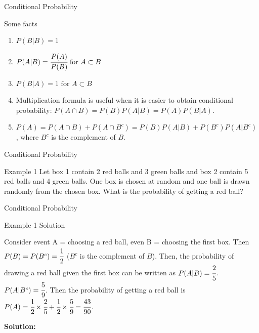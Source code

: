 \documentclass[aspectratio=169,xcolor=dvipsnames,svgnames,x11names,fleqn]{beamer}
\newcommand{\showanswers}{yes}
\begin{document}
    \begin{frame}[containsverbatim]{Conditional Probability}
        \begin{facts}{Some facts}
            \begin{enumerate}
                \item $P(B|B) = 1$
                \item $P(A|B) = \cfrac{P(A)}{P(B)} \text{~for~} A \subset B$
                \item $P (B|A) = 1  \text{~for~}  A \subset B$
                \item  Multiplication formula is useful when it is easier to obtain conditional probability: $P(A\cap B) = P(B) P(A|B)  = P(A) P(B|A)$.
                \item $P(A) = P(A\cap B)+ P(A \cap B^c) = P(B)P(A|B) + P(B^c) P(A|B^c)$ , where $B^c$ is the complement of $B$.
            \end{enumerate}
        \end{facts}
    \end{frame}
    \begin{frame}[containsverbatim]{Conditional Probability}

        \begin{exampleblock}{Example 1}
            Let box 1 contain 2 red balls and 3 green balls and box 2 contain 5 red balls and 4 green balls. One box is chosen at random and one ball is drawn randomly from the chosen box. What is the probability of getting a red ball?
        \end{exampleblock}
    \end{frame}
    \begin{frame}[containsverbatim]{Conditional Probability}
        \ifthenelse{\equal{\showanswers}{yes}}
        {
        \begin{examplesolution}{Example 1 Solution}
            
            Consider event A  = choosing a red ball, even B = choosing the first box. Then $P(B) = P(B^c) = \cfrac{1}{2}$ ($B^c$ is the complement of $B$).
            Then, the probability of drawing a red ball given the first box can be written as  $P(A|B) = \cfrac{2}{5}$.
            $P(A|B^c) = \cfrac{5}{9}$.
            Then the probability of getting a red ball is $P(A) = \cfrac{1}{2}\times\cfrac{2}{5} + \cfrac{1}{2}\times\cfrac{5}{9}  = \cfrac{43}{90}$.
        \end{examplesolution}
        }{
            \textbf{Solution:} \color{LightGray}{Blank space for calculation}
        }
    \end{frame}
    
\end{document}
